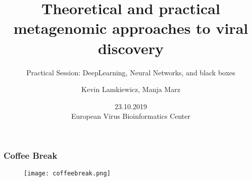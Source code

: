 

\title{Theoretical and practical metagenomic approaches to viral discovery}
\subtitle{Practical Session: DeepLearning, Neural Networks, and black boxes}
\author{Kevin Lamkiewicz, Manja Marz}
\date{23.10.2019\\[1em]European Virus Bioinformatics Center}



\begin{frame}
  \maketitle
\end{frame}

\beginbackup

\begin{frame}[c]\frametitle{Coffee Break}
  \begin{figure}[htbp]
    \centering
    \texttt{[image: coffeebreak.png]}
  \end{figure}
\end{frame}

\backupend

